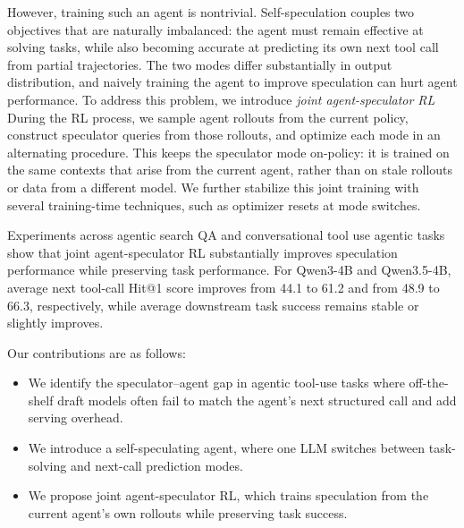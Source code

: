 However, training such an agent is nontrivial. Self-speculation couples two
objectives that are naturally imbalanced: the agent must remain effective at
solving tasks, while also becoming accurate at predicting its own next tool call
from partial trajectories. The two modes differ substantially in output
distribution, and naively training the agent to improve speculation can hurt
agent performance. To address this problem, we introduce \emph{joint agent-speculator RL}
During the RL process, we sample agent rollouts from the current policy, construct
speculator queries from those rollouts, and optimize each mode in an alternating procedure.
This keeps the speculator mode on-policy: it is trained on the same contexts that arise from the current agent, 
rather than on stale rollouts or data from a different model. We further stabilize this joint training with several training-time techniques, such as optimizer resets at mode switches.

Experiments across agentic search QA and conversational tool
use agentic tasks show that joint agent-speculator RL substantially improves speculation performance
while preserving task performance. For Qwen3-4B and Qwen3.5-4B, average 
next tool-call Hit@1 score improves from 44.1 to 61.2 and from 48.9 to 66.3, respectively,
while average downstream task success remains stable or slightly improves.

Our contributions are as follows:
\begin{itemize}
    \item We identify the speculator--agent gap in agentic tool-use tasks where off-the-shelf draft models often fail to match the agent's next structured call and add serving overhead.
    \item We introduce a self-speculating agent, where one LLM switches between task-solving and next-call prediction modes.
    \item We propose joint agent-speculator RL, which trains speculation from the current agent's own rollouts while preserving task success.
\end{itemize}
